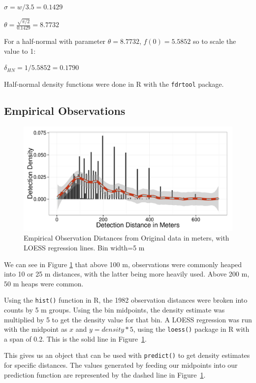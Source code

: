 \documentclass[12pt]{article}
\begin{document}
$\sigma = w/3.5 = 0.1429$

$\theta = \frac{\sqrt{\pi /2}}{0.1429}=8.7732$

For a half-normal with parameter $\theta=8.7732$, $f(0)=5.5852$ so to scale the value to 1:

$\delta_{HN} = 1/5.5852 = 0.1790$

Half-normal density functions were done in R with the \texttt{fdrtool} package.

\subsection{Empirical Observations}
\begin{figure}
	\includegraphics[width=\textwidth]{../images/loess.pdf}
	\caption{Empirical Observation Distances from Original data in meters, with LOESS regression lines. Bin width=5 m\label{fig:by5}}
\end{figure}

We can see in Figure \ref{fig:by5} that above 100 m, observations were commonly heaped into 10 or 25 m distances, with the latter being more heavily used. Above 200 m, 50 m heaps were common. 

Using the \texttt{hist()} function in R, the 1982 observation distances were broken into counts by 5 m groups. Using the bin midpoints, the density estimate was multiplied by 5 to get the density value for that bin. A LOESS regression was run with the midpoint as $x$ and $y=density*5$, using the \texttt{loess()} package in R with a span of 0.2. This is the solid line in Figure~\ref{fig:by5}. 

This gives us an object that can be used with \texttt{predict()} to get density estimates for specific distances. The values generated by feeding our midpoints into our prediction function are represented by the dashed line in Figure~\ref{fig:by5}. 
\end{document}
